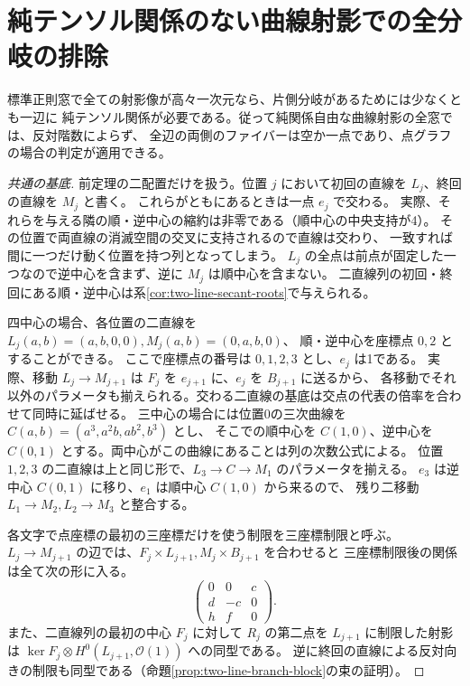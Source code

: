 \section{純テンソル関係のない曲線射影での全分岐の排除}
\label{sec:final-pure-branch-frames}
\begin{theorem}\label{thm:final-pure-branch-frames}
標準正則窓で全ての射影像が高々一次元なら、片側分岐があるためには少なくとも一辺に
純テンソル関係が必要である。従って純関係自由な曲線射影の全窓では、反対階数によらず、
全辺の両側のファイバーは空か一点であり、点グラフの場合の判定が適用できる。
\end{theorem}
\begin{proof}[共通の基底]
前定理の二配置だけを扱う。位置 $j$ において初回の直線を $L_j$、終回の直線を $M_j$ と書く。
これらがともにあるときは一点 $e_j$ で交わる。
実際、それらを与える隣の順・逆中心の縮約は非零である（順中心の中央支持が4）。
その位置で両直線の消滅空間の交叉に支持されるので直線は交わり、
一致すれば間に一つだけ動く位置を持つ列となってしまう。
$L_j$ の全点は前点が固定した一つなので逆中心を含まず、逆に $M_j$ は順中心を含まない。
二直線列の初回・終回にある順・逆中心は系\ref{cor:two-line-secant-roots}で与えられる。

四中心の場合、各位置の二直線を $L_j(a,b)=(a,b,0,0), M_j(a,b)=(0,a,b,0)$、
順・逆中心を座標点 $0,2$ とすることができる。
ここで座標点の番号は $0,1,2,3$ とし、$e_j$ は1である。
実際、移動 $L_j\to M_{j+1}$ は $F_j$ を $e_{j+1}$ に、$e_j$ を $B_{j+1}$ に送るから、
各移動でそれ以外のパラメータも揃えられる。交わる二直線の基底は交点の代表の倍率を合わせて同時に延ばせる。
三中心の場合には位置0の三次曲線を $C(a,b)=(a^3,a^2b,ab^2,b^3)$ とし、
そこでの順中心を $C(1,0)$、逆中心を $C(0,1)$ とする。両中心がこの曲線にあることは列の次数公式による。
位置 $1,2,3$ の二直線は上と同じ形で、$L_3\to C\to M_1$ のパラメータを揃える。
$e_3$ は逆中心 $C(0,1)$ に移り、$e_1$ は順中心 $C(1,0)$ から来るので、
残り二移動 $L_1\to M_2, L_2\to M_3$ と整合する。

各文字で点座標の最初の三座標だけを使う制限を三座標制限と呼ぶ。
$L_j\to M_{j+1}$ の辺では、$F_j\times L_{j+1}, M_j\times B_{j+1}$ を合わせると
三座標制限後の関係は全て次の形に入る。
\begin{equation}\label{eq:pure-branch-core-four}
         \begin{pmatrix}0&0&c\\ d&-c&0\\ h&f&0\end{pmatrix}.
\end{equation}
また、二直線列の最初の中心 $F_j$ に対して $R_j$ の第二点を $L_{j+1}$ に制限した射影は
$\ker F_j\otimes H^0(L_{j+1},\mathcal O(1))$ への同型である。
逆に終回の直線による反対向きの制限も同型である（命題\ref{prop:two-line-branch-block}の束の証明）。
\end{proof}


